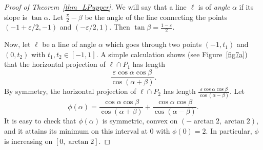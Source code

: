 \documentclass[11pt,a4paper]{amsart}
\newcommand{\eps}{\varepsilon}
\begin{document}
\begin{proof}[Proof of Theorem~\ref{thm_LPupper}]

We will say that a line $\ell$ is of  {\em angle} $\alpha$ if its slope is $\tan \alpha$. Let $\frac \pi 2 - \beta$ be the angle of the line connecting the points $(-1 + \eps/2, -1)$ and $(- \eps/2, 1)$. Then $\tan \beta = \frac {1 - \eps}{2}$.

Now, let $\ell$ be a line of angle $\alpha$ which goes through two points $(-1, t_1)$ and $(0, t_2)$ with $t_1, t_2 \in [-1, 1]$. A simple calculation shows (see Figure~\ref{fig7a}) that the horizontal projection of $\ell \cap P_1$ has length
\[
\frac{\eps \cos \alpha \cos \beta}{\cos(\alpha + \beta)}.
\]
By symmetry, the horizontal projection of $\ell \cap P_2$ has length $\frac{\eps \cos \alpha \cos \beta}{\cos(\alpha - \beta)}$. Let
\begin{equation}\label{fidef}
\phi(\alpha) = \frac{ \cos \alpha \cos \beta}{\cos(\alpha + \beta)} + \frac{ \cos \alpha \cos \beta}{\cos(\alpha - \beta)}.
\end{equation}
It is easy to check that $\phi(\alpha)$ is symmetric, convex on $(- \arctan 2, \arctan 2)$, and it attains its minimum on this interval at 0 with $\phi(0) =2$. In particular, $\phi$ is increasing on $[0, \arctan 2]$.



\end{proof}
\end{document}
